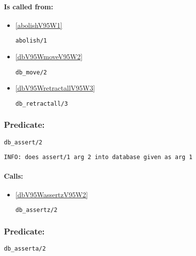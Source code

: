 \paragraph{Is called from:} 
\begin{itemize}
\item \ref{abolishV95W1} 
\begin{verbatim}
abolish/1
\end{verbatim}

\item \ref{dbV95WmoveV95W2} 
\begin{verbatim}
db_move/2
\end{verbatim}

\item \ref{dbV95WretractallV95W3} 
\begin{verbatim}
db_retractall/3
\end{verbatim}

\end{itemize}

\subsubsection{Predicate:} \label{dbV95WassertV95W2}

\begin{verbatim}
db_assert/2
\end{verbatim}

{\small \begin{verbatim}
INFO: does assert/1 arg 2 into database given as arg 1

\end{verbatim}}
\paragraph{Calls:} 
\begin{itemize}
\item \ref{dbV95WassertzV95W2} 
\begin{verbatim}
db_assertz/2
\end{verbatim}

\end{itemize}

\subsubsection{Predicate:} \label{dbV95WassertaV95W2}

\begin{verbatim}
db_asserta/2
\end{verbatim}

